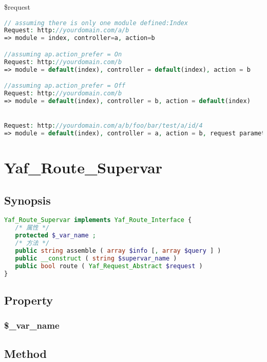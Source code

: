\begin{compactitem}
\item \$request
\end{compactitem}



\begin{lstlisting}[language=PHP]
// assuming there is only one module defined:Index
Request: http://yourdomain.com/a/b
=> module = index, controller=a, action=b

//assuming ap.action_prefer = On
Request: http://yourdomain.com/b
=> module = default(index), controller = default(index), action = b

//assuming ap.action_prefer = Off
Request: http://yourdomain.com/b
=> module = default(index), controller = b, action = default(index)


Request: http://yourdomain.com/a/b/foo/bar/test/a/id/4
=> module = default(index), controller = a, action = b, request parameters: foo = bar, test = a, id = 4
\end{lstlisting}

\chapter{Yaf\_Route\_Supervar}


\section{Synopsis}






\begin{lstlisting}[language=PHP]
Yaf_Route_Supervar implements Yaf_Route_Interface {
   /* 属性 */
   protected $_var_name ;
   /* 方法 */
   public string assemble ( array $info [, array $query ] )
   public __construct ( string $supervar_name )
   public bool route ( Yaf_Request_Abstract $request )
}
\end{lstlisting}

\section{Property}


\subsection{\$\_var\_name}


\section{Method}


